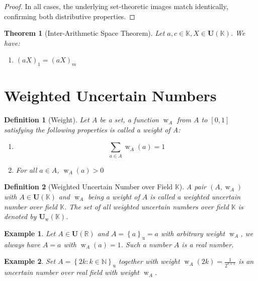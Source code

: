 \documentclass[a4paper,12pt, twoside]{memoir}
\newtheorem{definition}{Definition}[chapter]
\newtheorem{theorem}{Theorem}[chapter]
\newtheorem{example}{Example}[chapter]
\DeclareMathOperator{\w}{w}
\newcommand{\set}[1]{\left\{#1\right\}} %
\newcommand{\s}[1]{\set{#1}_\mathrm{u}} %
\newcommand{\tsbd}[1]{\mathbf{U}(\mathbb{#1})}
\newcommand{\tsbdts}[1]{\mathbf{U}_{\w}(\mathbb{#1})} %
\newcommand{\ts}[1]{\w_{#1}} %
\newcommand{\kgdd}[1]{\left(#1\right)_1} %
\newcommand{\kgdt}[1]{\left(#1\right)_m} %
\begin{document}
\begin{proof}
	In all cases, the underlying set-theoretic images match identically, confirming both distributive properties.
\end{proof}
\begin{theorem}[Inter-Arithmetic Space Theorem]
	Let $a,c \in \mathbb{K}, X \in \tsbd{K}$. We have:
	\begin{enumerate}[leftmargin=*]
		\item $\kgdd{aX} = \kgdt{aX}$
	\end{enumerate}
\end{theorem}

\section{Weighted Uncertain Numbers}

\begin{definition}[Weight]
	Let $A$ be a set, a function $\ts{A}$ from $A$ to $[0,1]$ satisfying the following properties is called a weight of A:
	\begin{enumerate}[leftmargin=*]
		\item $$\sum_{a \in A}{\ts{A}(a) } = 1$$
		\item For all $a \in A$, $\ts{A}(a) > 0 $
	\end{enumerate}
\end{definition}

\begin{definition}[Weighted Uncertain Number over Field $\mathbb{K}$]
	A pair $(A,\ts{A})$ with $A \in \tsbd{K}$ and $\ts{A}$ being a weight of $A$ is called a weighted uncertain number over field $\mathbb{K}$. The set of all weighted uncertain numbers over field $\mathbb{K}$ is denoted by $\tsbdts{K}$.
\end{definition}

\begin{example}
	Let $A \in \tsbd{R}$ and $A = \s{a} = a $ with arbitrary weight $\ts{A}$, we always have $A = a$ with $\ts{A}(a) =1$. Such a number $A$ is a real number.
\end{example}

\begin{example}
	Set $A=\s{2k : k \in \mathbb{N}}$ together with weight $\ts{A}(2k) = \frac{1}{2^{k+1}}$ is an uncertain number over real field with weight $\ts{A}$.
\end{example}
\end{document}
